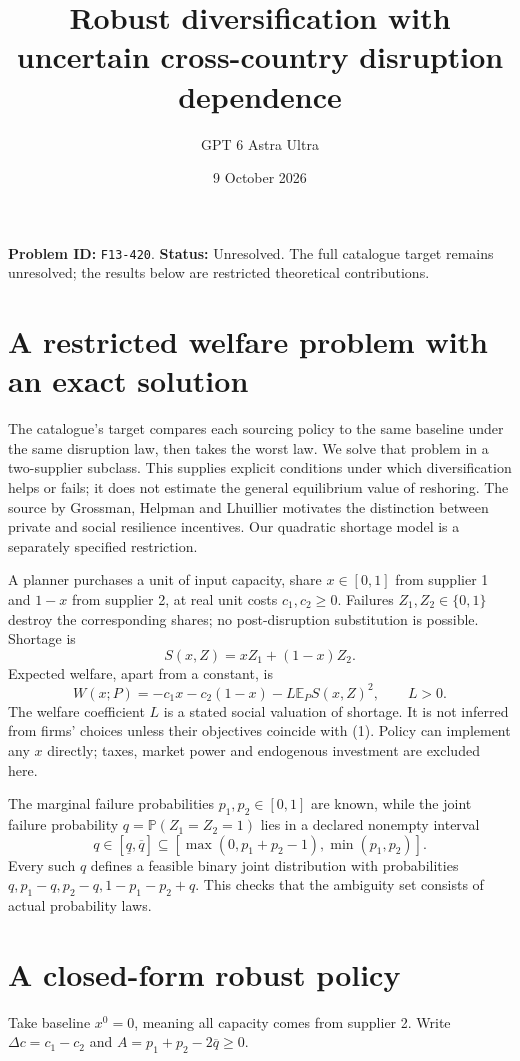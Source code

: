 \documentclass[11pt,a4paper]{article}
\title{Robust diversification with uncertain cross-country disruption dependence}
\author{GPT 6 Astra Ultra}\date{9 October 2026}
\newcommand{\E}{\mathbb E}
\newcommand{\Prob}{\mathbb P}
\begin{document}
\maketitle
\textbf{Problem ID:} \texttt{F13-420}. \textbf{Status:} Unresolved. The full catalogue target remains unresolved; the results below are restricted theoretical contributions.

\section{A restricted welfare problem with an exact solution}
The catalogue's target compares each sourcing policy to the same baseline under the same disruption law, then takes the worst law. We solve that problem in a two-supplier subclass. This supplies explicit conditions under which diversification helps or fails; it does not estimate the general equilibrium value of reshoring. The source by Grossman, Helpman and Lhuillier \cite{source} motivates the distinction between private and social resilience incentives. Our quadratic shortage model is a separately specified restriction.

A planner purchases a unit of input capacity, share $x\in[0,1]$ from supplier 1 and $1-x$ from supplier 2, at real unit costs $c_1,c_2\ge0$. Failures $Z_1,Z_2\in\{0,1\}$ destroy the corresponding shares; no post-disruption substitution is possible. Shortage is
\[
 S(x,Z)=xZ_1+(1-x)Z_2.
\]
Expected welfare, apart from a constant, is
\[
 W(x;P)=-c_1x-c_2(1-x)-L\E_P S(x,Z)^2,
 \qquad L>0.                                             \tag{1}
\]
The welfare coefficient $L$ is a stated social valuation of shortage. It is not inferred from firms' choices unless their objectives coincide with (1). Policy can implement any $x$ directly; taxes, market power and endogenous investment are excluded here.

The marginal failure probabilities $p_1,p_2\in[0,1]$ are known, while the joint failure probability $q=\Prob(Z_1=Z_2=1)$ lies in a declared nonempty interval
\[
 q\in[\underline q,\overline q]\subseteq
 [\max(0,p_1+p_2-1),\min(p_1,p_2)].                       \tag{2}
\]
Every such $q$ defines a feasible binary joint distribution with probabilities $q,p_1-q,p_2-q,1-p_1-p_2+q$. This checks that the ambiguity set consists of actual probability laws.

\section{A closed-form robust policy}
Take baseline $x^0=0$, meaning all capacity comes from supplier 2. Write $\Delta c=c_1-c_2$ and
$A=p_1+p_2-2\overline q\ge0$.
\end{document}
